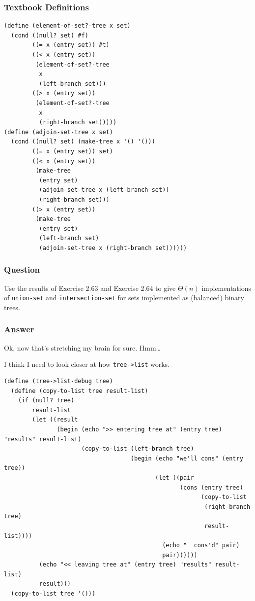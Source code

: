 \documentclass[final,fleqn,titlepage,twoside]{article}
\begin{document}
\subsubsection{Textbook Definitions}
\label{sec:org7901ee0}
\begin{verbatim}
(define (element-of-set?-tree x set)
  (cond ((null? set) #f)
        ((= x (entry set)) #t)
        ((< x (entry set))
         (element-of-set?-tree
          x 
          (left-branch set)))
        ((> x (entry set))
         (element-of-set?-tree
          x 
          (right-branch set)))))
(define (adjoin-set-tree x set)
  (cond ((null? set) (make-tree x '() '()))
        ((= x (entry set)) set)
        ((< x (entry set))
         (make-tree 
          (entry set)
          (adjoin-set-tree x (left-branch set))
          (right-branch set)))
        ((> x (entry set))
         (make-tree
          (entry set)
          (left-branch set)
          (adjoin-set-tree x (right-branch set))))))
\end{verbatim}

\subsubsection{Question}
\label{sec:org3a8877e}
Use the results of Exercise 2.63 and Exercise 2.64 to give \(\Theta(n)\)
implementations of \texttt{union-set} and \texttt{intersection-set} for
sets implemented as (balanced) binary trees.

\subsubsection{Answer}
\label{sec:org6ac54ba}
Ok, now that's stretching my brain for sure. Hmm\ldots{}

I think I need to look closer at how \texttt{tree->list} works.

\begin{verbatim}
(define (tree->list-debug tree)
  (define (copy-to-list tree result-list)
    (if (null? tree)
        result-list
        (let ((result
               (begin (echo ">> entering tree at" (entry tree) "results" result-list)
                      (copy-to-list (left-branch tree)
                                    (begin (echo "we'll cons" (entry tree))
                                           (let ((pair
                                                  (cons (entry tree)
                                                        (copy-to-list
                                                         (right-branch tree)
                                                         result-list))))
                                             (echo "  cons'd" pair)
                                             pair))))))
          (echo "<< leaving tree at" (entry tree) "results" result-list)
          result)))
  (copy-to-list tree '()))
\end{verbatim}
\end{document}
